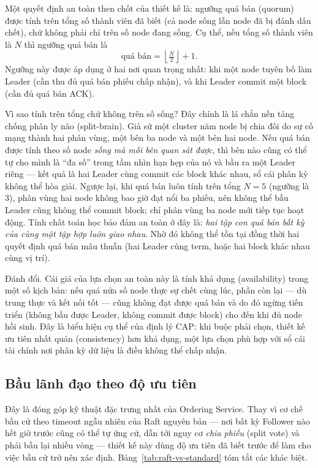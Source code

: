 Một quyết định an toàn then chốt của thiết kế là: ngưỡng quá bán (quorum)
được tính trên tổng số thành viên đã biết (cả node sống lẫn node đã bị
đánh dấu chết), chứ không phải chỉ trên số node đang sống. Cụ thể, nếu tổng số
thành viên là $N$ thì ngưỡng quá bán là
\[
  \text{quá bán} = \left\lfloor \tfrac{N}{2} \right\rfloor + 1 .
\]
Ngưỡng này được áp dụng ở hai nơi quan trọng nhất: khi một node tuyên bố làm Leader
(cần thu đủ quá bán phiếu chấp nhận), và khi Leader commit một block (cần đủ quá
bán ACK).

Vì sao tính trên tổng chứ không trên số sống? Đây chính là lá chắn nền
tảng chống phân ly não (split-brain). Giả sử một cluster năm node bị chia
đôi do sự cố mạng thành hai phân vùng, một bên ba node và một bên hai node. Nếu
quá bán được tính theo số node \textit{sống mà mỗi bên quan sát được}, thì bên nào
cũng có thể tự cho mình là ``đa số'' trong tầm nhìn hạn hẹp của nó và bầu ra một
Leader riêng --- kết quả là hai Leader cùng commit các block khác nhau, sổ cái
phân kỳ không thể hòa giải. Ngược lại, khi quá bán luôn tính trên tổng
$N = 5$ (ngưỡng là 3), phân vùng hai node không bao giờ đạt nổi ba phiếu,
nên không thể bầu Leader cũng không thể commit block; chỉ phân vùng ba node mới
tiếp tục hoạt động. Tính chất toán học bảo đảm an toàn ở đây là: \textit{hai tập
con quá bán bất kỳ của cùng một tập hợp luôn giao nhau}. Nhờ đó không thể tồn tại
đồng thời hai quyết định quá bán mâu thuẫn (hai Leader cùng term, hoặc hai block
khác nhau cùng vị trí).

Đánh đổi. Cái giá của lựa chọn an toàn này là tính khả dụng (availability)
trong một số kịch bản: nếu quá nửa số node thực sự chết cùng lúc, phần còn lại ---
dù trung thực và kết nối tốt --- cũng không đạt được quá bán và do đó ngừng tiến
triển (không bầu được Leader, không commit được block) cho đến khi đủ node hồi
sinh. Đây là biểu hiện cụ thể của định lý CAP: khi buộc phải chọn, thiết kế ưu tiên
nhất quán (consistency) hơn khả dụng, một lựa chọn phù hợp với sổ cái tài
chính nơi phân kỳ dữ liệu là điều không thể chấp nhận.

\subsection{Bầu lãnh đạo theo độ ưu tiên}
\label{sec:leader-election}

Đây là đóng góp kỹ thuật đặc trưng nhất của Ordering Service. Thay vì cơ chế bầu
cử theo timeout ngẫu nhiên của Raft nguyên bản --- nơi bất kỳ Follower nào hết giờ
trước cũng có thể tự ứng cử, dẫn tới nguy cơ \textit{chia phiếu} (split vote) và
phải bầu lại nhiều vòng --- thiết kế này dùng độ ưu tiên đã biết trước để làm cho
việc bầu cử trở nên xác định. Bảng~\ref{tab:raft-vs-standard} tóm tắt các
khác biệt.

